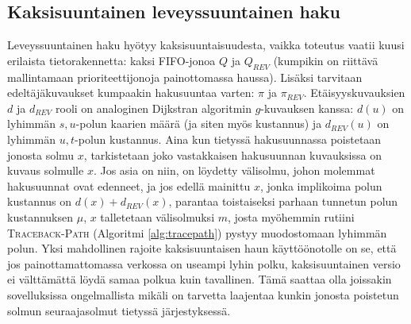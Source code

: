 \documentclass[finnish]{tktltiki2}
\theoremstyle{definition}
\theoremstyle{remark}
\begin{document}
\subsection{Kaksisuuntainen leveyssuuntainen haku}
Leveyssuuntainen haku hyötyy kaksisuuntaisuudesta, vaikka toteutus vaatii kuusi erilaista tietorakennetta: kaksi FIFO-jonoa $Q$ ja $Q_{REV}$ (kumpikin on riittävä mallintamaan prioriteettijonoja painottomassa haussa). Lisäksi tarvitaan edeltäjäkuvaukset kumpaakin hakusuuntaa varten: $\pi$ ja $\pi_{REV}$. Etäisyyskuvauksien $d$ ja $d_{REV}$ rooli on analoginen Dijkstran algoritmin $g$-kuvauksen kanssa: $d(u)$ on lyhimmän $s, u$-polun kaarien määrä (ja siten myös kustannus) ja $d_{REV}(u)$ on lyhimmän $u, t$-polun kustannus. Aina kun tietyssä hakusuunnassa poistetaan jonosta solmu $x$, tarkistetaan joko vastakkaisen hakusuunnan kuvauksissa on kuvaus solmulle $x$. Jos asia on niin, on löydetty välisolmu, johon molemmat hakusuunnat ovat edenneet, ja jos edellä mainittu $x$, jonka implikoima polun kustannus on $d(x) + d_{REV}(x)$, parantaa toistaiseksi parhaan tunnetun polun kustannuksen $\mu$, $x$ talletetaan välisolmuksi $m$, josta myöhemmin rutiini \textsc{Traceback-Path} (Algoritmi \ref{alg:tracepath}) pystyy muodostomaan lyhimmän polun. Yksi mahdollinen rajoite kaksisuuntaisen haun käyttöönotolle on se, että jos painottamattomassa verkossa on useampi lyhin polku, kaksisuuntainen versio ei välttämättä löydä samaa polkua kuin tavallinen. Tämä saattaa olla joissakin sovelluksissa ongelmallista mikäli on tarvetta laajentaa kunkin jonosta poistetun solmun seuraajasolmut tietyssä järjestyksessä.
\end{document}
